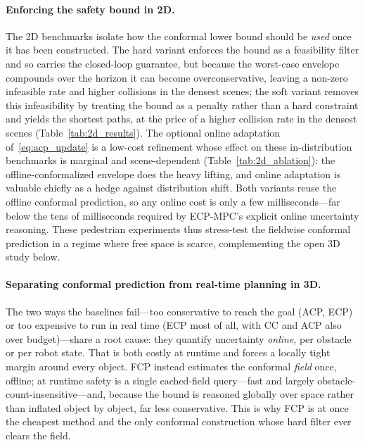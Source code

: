 \documentclass[lettersize,journal]{IEEEtran}
\begin{document}
\paragraph{Enforcing the safety bound in 2D.}
The 2D benchmarks isolate how the conformal lower bound should be \emph{used}
once it has been constructed.
The hard variant enforces the bound as a feasibility filter and so carries the
closed-loop guarantee, but because the worst-case envelope compounds over the horizon
it can become overconservative, leaving a non-zero infeasible rate and higher collisions
in the densest scenes; the soft variant removes this infeasibility by treating the bound
as a penalty rather than a hard constraint and yields the shortest paths, at the price of
a higher collision rate in the densest scenes (Table~\ref{tab:2d_results}).
The optional online adaptation of~\eqref{eq:acp_update} is a low-cost refinement whose
effect on these in-distribution benchmarks is marginal and scene-dependent
(Table~\ref{tab:2d_ablation}): the offline-conformalized envelope does the heavy lifting,
and online adaptation is valuable chiefly as a hedge against distribution shift.
Both variants reuse the offline conformal prediction, so any online cost is only a few
milliseconds---far below the tens of milliseconds required by ECP-MPC's explicit
online uncertainty reasoning.
These pedestrian experiments thus stress-test the fieldwise conformal prediction in a regime
where free space is scarce, complementing the open 3D study below.



\paragraph{Separating conformal prediction from real-time planning in 3D.}
The two ways the baselines fail---too conservative to reach the goal (ACP, ECP) or too
expensive to run in real time (ECP most of all, with CC and ACP also over budget)---share a
root cause: they quantify uncertainty \emph{online}, per obstacle or per robot state. That is
both costly at runtime and forces a locally tight margin around every object. FCP instead
estimates the conformal \emph{field} once, offline; at runtime safety is a single cached-field
query---fast and largely obstacle-count-insensitive---and, because the bound is reasoned
globally over space rather than inflated object by object, far less conservative. This is why
FCP is at once the cheapest method and the only conformal construction whose hard filter ever
clears the field.
\end{document}
